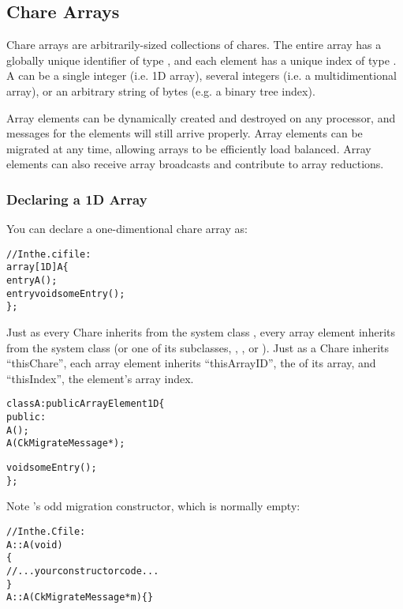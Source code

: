 \subsection{Chare Arrays}

Chare arrays  are arbitrarily-sized collections of chares.  The
entire array has a globally unique identifier of type , and
each element has a unique index of type .  A 
can be a single integer (i.e. 1D array), several integers (i.e. a
multidimentional array), or an arbitrary string of bytes (e.g. a binary tree
index).

Array elements can be dynamically created and destroyed on any processor,
and messages for the elements will still arrive properly.
Array elements can be migrated at any time, allowing arrays to be efficiently
load balanced.  Array elements can also receive array broadcasts and
contribute to array reductions.

\subsubsection{Declaring a 1D Array}

You can declare a one-dimentional chare array
as:

\begin{alltt}
//In the .ci file:
array [1D] A \{
  entry A();
  entry void someEntry();
\};
\end{alltt}

Just as every Chare inherits from the system class , every 
array element inherits from the system class  (or one
of its subclasses, , , or 
). Just as a Chare inherits ``thisChare'', each
array element inherits ``thisArrayID'', the  of its array,
and ``thisIndex'', the element's array index.

\begin{alltt}
class A : public ArrayElement1D \{
  public:
    A();
    A(CkMigrateMessage *);

    void someEntry();
\};
\end{alltt}

Note 's odd migration constructor, which is normally empty:

\begin{alltt}
//In the .C file:
A::A(void)
\{
  //...your constructor code...
\}
A::A(CkMigrateMessage *m) \{ \}
\end{alltt}

